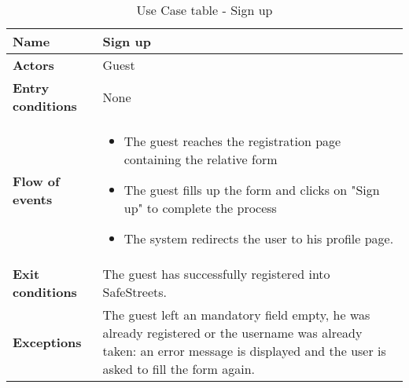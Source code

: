 \begin{table}[!htbp]
	\hypertarget{tab:signupusecase}{}
\centering
\begin{tabular}{lp{8cm}}
\bf\large Name&\bf\large Sign up\\
\hline
\hline
\bf Actors&Guest\\
\hline
\bf Entry conditions&None\\
\hline
\bf Flow of events&
\begin{itemize}
\item The guest reaches the registration page containing the relative form
\item The guest fills up the form and clicks on "Sign up" to complete the process
\item The system redirects the user to his profile page.
\end{itemize}
\\
\hline
\bf Exit conditions&The guest has successfully registered into SafeStreets. \\
\hline
\bf Exceptions&The guest left an mandatory field empty, he was already registered or the username was already taken: an error message is displayed and the user is asked to fill the form again.\\
\hline

\end{tabular}
\caption{Use Case table - Sign up} \label{tab:signup}
\end{table}
